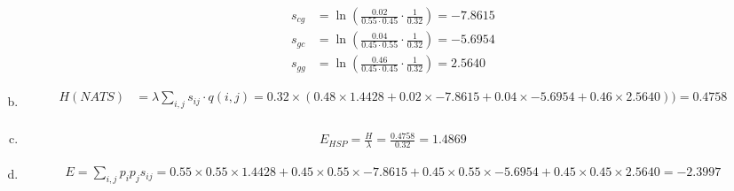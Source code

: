 \documentclass{article}
\begin{document}
\begin{flushleft}
\begin{enumerate}[(a)]
\begin{align*}
        s_{cg} &= \ln(\frac{0.02}{0.55 \cdot 0.45} \cdot \frac{1}{0.32}) = -7.8615 \\
        s_{gc} &= \ln(\frac{0.04}{0.45 \cdot 0.55} \cdot \frac{1}{0.32}) = -5.6954 \\
        s_{gg} &= \ln(\frac{0.46}{0.45 \cdot 0.45} \cdot \frac{1}{0.32}) = 2.5640
    \end{align*}
    \item
    \begin{align*}
        H(NATS) &= \lambda \sum_{i,j} s_{ij} \cdot q(i,j) = 0.32 \times (0.48 \times 1.4428 + 0.02 \times -7.8615 + 0.04 \times -5.6954 + 0.46 \times 2.5640)) = 0.4758 \\
    \end{align*}
    \item 
    \begin{align*}
        E_{HSP} = \frac{H}{\lambda} = \frac{0.4758}{0.32} = 1.4869
    \end{align*}
    \item 
    \begin{align*}
        E = \sum_{i,j} p_i p_j s_{ij} = 0.55 \times 0.55 \times 1.4428 + 0.45 \times 0.55 \times -7.8615 + 0.45 \times 0.55 \times -5.6954 + 0.45 \times 0.45 \times 2.5640 = -2.3997
    \end{align*}
\end{enumerate}
\end{flushleft}
\end{document}
